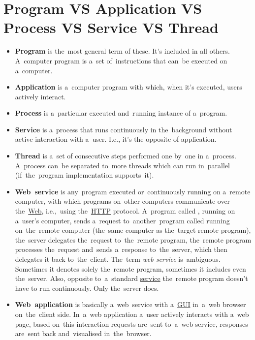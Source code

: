 \section*{\fontsize{17}{17} \selectfont Program VS Application VS Process VS Service VS Thread}
\label{applicationprocessprogramservicethread}
\begin{itemize}
    \item \textbf{Program} is the~most general term of these.
          It's included in all others.
          A~computer program is a~set of~instructions that can~be executed on a~computer.
    \item \textbf{Application} is a~computer program with which, when it's executed, users actively interact.
    \item \textbf{Process} is a~particular executed and~running instance of a~program.
    \item \textbf{Service} is a~process that runs continuously in the~background without active interaction with a~user.
          I.e., it's the opposite of application.
    \item \textbf{Thread} is a~set of consecutive steps performed one by~one in a~process.
          A~process can~be separated to~more threads which can run in~parallel (if~the~program implementation supports~it).
\end{itemize}

\label{webserviceapplication}
\begin{itemize}
    \item \textbf{Web~service} is any~program executed or~continuously running on a~remote computer, with which programs on~other computers communicate over the~\hyperref[internetweb]{Web}, i.e.,~using the~\hyperref[http]{HTTP} protocol.
          A~program called \hyperref[clientserverarchitecture]{}, running on a~user's computer, sends a~request to~another~program called \hyperref[clientserverarchitecture]{} running on~the~remote computer (the~same computer as the~target remote program), the~server delegates the~request to~the~remote program, the~remote program processes the~request and~sends a~response to~the~server, which then delegates it back to~the~client.
          \warningnonl The~term \textit{web service} is~ambiguous.
          Sometimes it denotes solely the~remote program, sometimes it includes even the~server.
          Also, opposite to~a~standard \hyperref[applicationprocessprogramservicethread]{service} the~remote program doesn't have to run continuously.
          Only the~server does.
    \item \textbf{Web~application} is basically a~web~service with a~\hyperref[shellcligui]{GUI} in~a~web browser on~the~client side.
          In~a~web application a~user actively interacts with a~web page, based on~this interaction requests are~sent to~a~web service, responses are~sent back and~visualised in~the~browser.
\end{itemize}
\newpage

